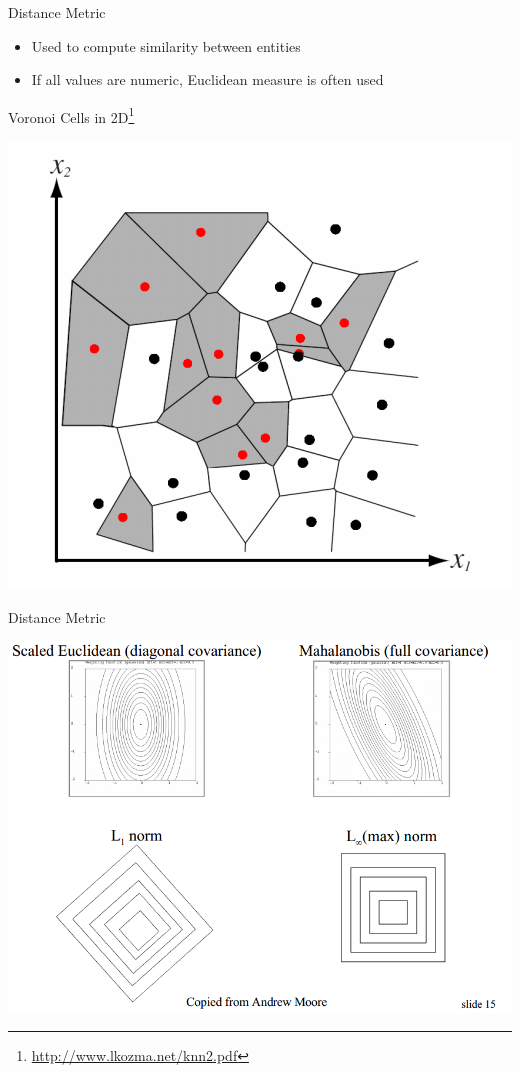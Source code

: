 \documentclass{beamer}
\newcommand{\furl}[1]{{\footnote{\url{#1}}}}
\begin{document}
\begin{frame}{Distance Metric}
    \begin{itemize}
        \item Used to compute similarity between entities
        \item If all values are numeric, Euclidean measure is often used
    \end{itemize}
\end{frame}
\begin{frame}{Voronoi Cells in 2D\furl{http://www.lkozma.net/knn2.pdf}}
    \begin{center}
        \includegraphics[scale=0.5]{voronoi2D.png}
    \end{center}
\end{frame}
\begin{frame}{Distance Metric}
    \begin{center}
        \includegraphics[scale=0.3]{distanceMetric.png}
    \end{center}
\end{frame}
\end{document}
